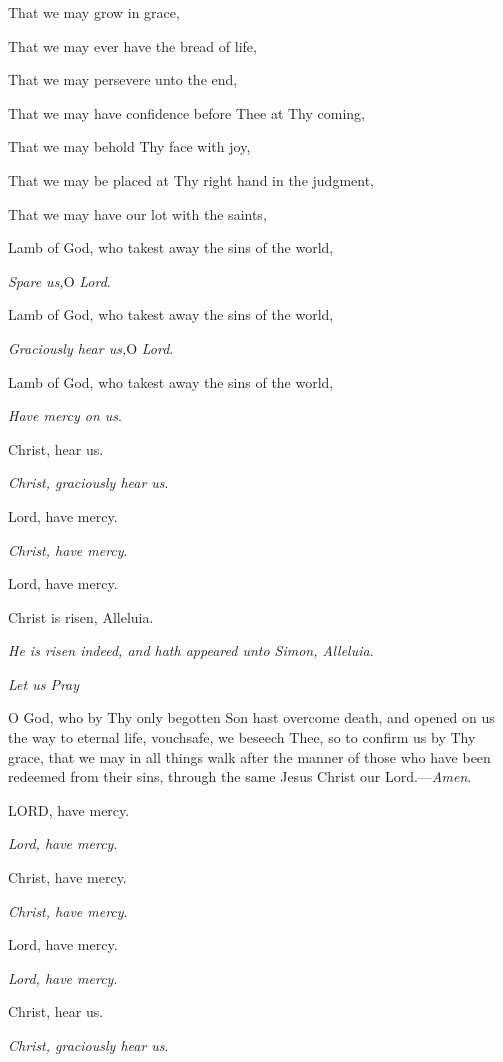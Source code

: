 That we may grow in grace,

That we may ever have the bread of life,

That we may persevere unto the end,

That we may have confidence before Thee at Thy coming,

That we may behold Thy face with joy,

That we may be placed at Thy right hand in the judgment,

That we may have our lot with the saints,

Lamb of God, who takest away the
sins of the world,

\emph{Spare us,}O \emph{Lord}.

Lamb of God, who takest away the sins of the world,

\emph{Graciously hear us,}O \emph{Lord}. 

Lamb of God, who takest away the sins of the world,

\emph{Have mercy on us}.

Christ, hear us.

\emph{Christ, graciously hear us}.

Lord, have mercy.

\emph{Christ, have mercy}.

Lord, have mercy.

Christ is risen, Alleluia.

\emph{He is risen indeed, and hath appeared unto Simon, Alleluia}.

\emph{Let
us Pray}

O God, who by Thy only begotten
Son hast overcome death, and opened on us the way to eternal life,
vouchsafe, we beseech Thee, so to confirm us by Thy grace, that we may
in all things walk after the manner of those who have been redeemed from
their sins, through the same Jesus Christ our Lord.—\emph{Amen}.



LORD, have mercy.

\emph{Lord, have mercy}.

Christ, have mercy.

\emph{Christ, have mercy}.

Lord, have mercy.

\emph{Lord, have mercy}.

Christ, hear us.

\emph{Christ, graciously hear us}.

